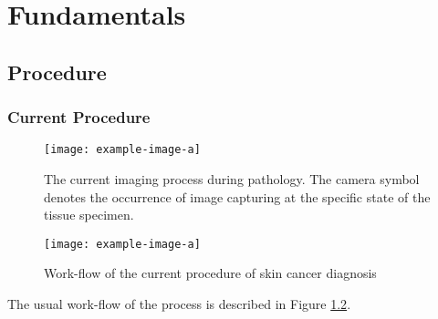 \chapter{Fundamentals}

\section{Procedure}

\subsection{Current Procedure}

\par \blindtext 

\begin{comment}
this is hidden 
\end{comment}

\begin{figure}[ht]
\begin{center}
  \texttt{[image: example-image-a]}
  \caption{The current imaging process during pathology. The camera symbol denotes the occurrence of image capturing at the specific state of the tissue specimen.}
  \label{fig:currentimaging}
\end{center}
\end{figure}



\begin{figure}[H]
\begin{center}
  \texttt{[image: example-image-a]}
  \caption{Work-flow of the current procedure of skin cancer diagnosis}
  \label{fig:currentdiagnosis}
\end{center}
\end{figure}

\par The usual work-flow of the process is described in Figure \ref{fig:currentdiagnosis}. \Blindtext  



